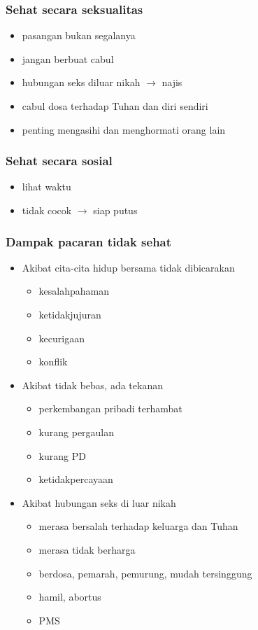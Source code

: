 \documentclass[12pt,a4paper]{beamer}
\begin{document}
\begin{frame}
\frametitle{Sehat secara seksualitas}
\begin{itemize}[<+->]
\item pasangan bukan segalanya
\item jangan berbuat cabul
\item hubungan seks diluar nikah $\rightarrow$ najis
\item cabul dosa terhadap Tuhan dan diri sendiri
\item penting mengasihi dan menghormati orang lain
\end{itemize}
\end{frame}

\begin{frame}
\frametitle{Sehat secara sosial}
\begin{itemize}[<+->]
\item lihat waktu
\item tidak cocok $\rightarrow$ siap putus
\end{itemize}
\end{frame}

\begin{frame}
\frametitle{Dampak pacaran tidak sehat}
\begin{itemize}[<+->]
\item Akibat  cita-cita hidup bersama tidak dibicarakan
\begin{itemize}[<+->]
\item kesalahpahaman
\item ketidakjujuran
\item kecurigaan
\item konflik
\end{itemize}
\item Akibat tidak bebas, ada tekanan
\begin{itemize}[<+->]
\item perkembangan pribadi terhambat
\item kurang pergaulan
\item kurang PD
\item ketidakpercayaan
\end{itemize}
\item Akibat hubungan seks di luar nikah
\begin{itemize}[<+->]
\item merasa bersalah terhadap keluarga dan Tuhan 
\item merasa tidak berharga
\item berdosa, pemarah, pemurung, mudah tersinggung
\item hamil, abortus
\item PMS
\end{itemize}

\end{itemize}
\end{frame}
\end{document}

